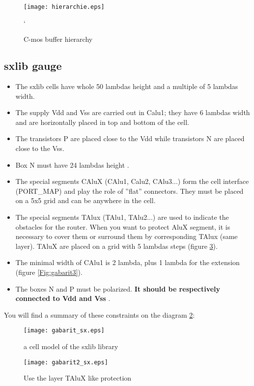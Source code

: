 \documentclass[12pt]{article}
\begin{document}
\begin{figure}[H]\centering
  \texttt{[image: hierarchie.eps]}
  \caption{C-mos buffer hierarchy}
  \label{Fig:hier_x1}
`\end{figure}

\subsection{sxlib gauge}

\begin{itemize}\itemsep=-.4ex
\item The sxlib cells have whole 50 lambdas height and a multiple of 5 lambdas width.
\item The supply Vdd and Vss are carried out in Calu1; they have 6 lambdas width and are 
horizontally placed in top and bottom of the cell.
\item The transistors P are placed close to the Vdd while transistors N are placed close
        to the Vss.
\item Box N must have 24 lambdas height .
\item The special segments CAluX (CAlu1, Calu2, CAlu3...) form the cell interface (PORT\_MAP) 
and play the role of ''flat'' connectors. They must be placed on a 5x5 grid and can be anywhere in the cell.
\item The special segments TAlux (TAlu1, TAlu2...) are used to indicate the obstacles for the
        router. When you want to protect AluX segment, it is necessary to cover them
        or surround them by corresponding TAlux (same layer). TAluX are placed on a grid
        with 5 lambdas steps (figure \ref{Fig:gabarit2}).
\item The minimal width of CAlu1 is 2 lambda, plus 1 lambda for the extension (figure \ref{Fig:gabarit3}).
\item The boxes N and P must be polarized. { \bf It should be respectively connected to Vdd and Vss }.
\end{itemize}

You will find a summary of these constraints on the diagram 
\ref{Fig:gabarit}:

\begin{figure}[H]\centering
  \texttt{[image: gabarit\_sx.eps]}
  \caption{a cell model of the sxlib library }
  \label{Fig:gabarit}
\end{figure}

\begin{figure}[H]\centering
  \texttt{[image: gabarit2\_sx.eps]}
  \caption{Use the layer TAluX like protection}
  \label{Fig:gabarit2}
\end{figure}
\end{document}
